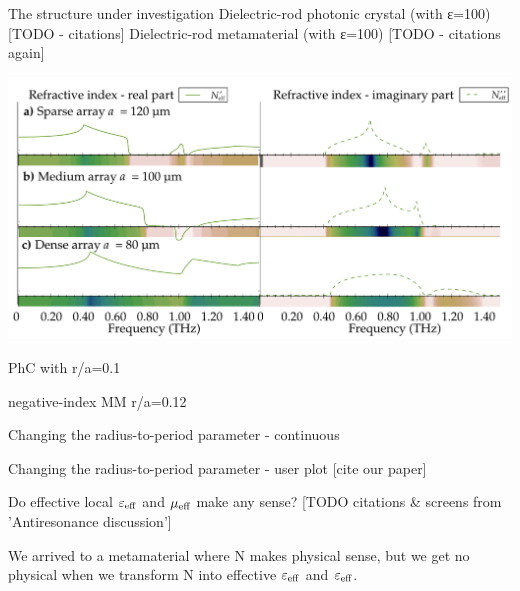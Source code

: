 \documentclass[t]{beamer} \usepackage[czech]{babel} \usepackage[utf8]{inputenc} \usetheme{Frankfurt} %
\begin{document}
The structure under investigation
Dielectric-rod photonic crystal (with ε=100)  [TODO - citations]
Dielectric-rod metamaterial (with ε=100) [TODO - citations again]

\includegraphics[width=1.\framewidth]{../img/ERods_sketch_of_separate_spectra_to_continuous_scan.pdf}


\begin{frame}{}	%
\end{frame} 		%

\begin{frame}{}	%
PhC with r/a=0.1
\end{frame} 		%

\begin{frame}{}	%
negative-index MM r/a=0.12

\end{frame} 		%

\begin{frame}{}	%
Changing the radius-to-period parameter - continuous

\end{frame} 		%

\begin{frame}{}	%
Changing the radius-to-period parameter - user plot [cite our paper]

\end{frame} 		%

\begin{frame}{}	%
Do effective local $\varepsilon_{\text{eff} }$ and $\mu_{\text{eff} }$ make any sense? [TODO citations & screens from 'Antiresonance discussion']

We arrived to a metamaterial where N makes physical sense, but we get no physical  when we transform N into effective $\varepsilon_{\text{eff} }$ and $\varepsilon_{\text{eff} }$.
\end{frame} 		%
\end{document}
